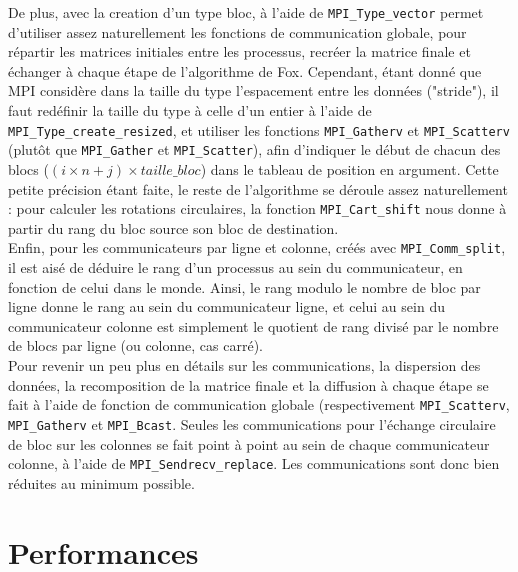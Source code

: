 \documentclass[a4paper,11pt]{article}
\begin{document}
De plus, avec la creation d'un type bloc, à l'aide de \texttt{MPI\_Type\_vector} permet d'utiliser assez naturellement les fonctions de communication globale, pour répartir les matrices initiales entre les processus, recréer la matrice finale et échanger à chaque étape de l'algorithme de Fox.
Cependant, étant donné que MPI considère dans la taille du type l'espacement entre les données ("stride"), il faut redéfinir la taille du type à celle d'un entier à l'aide de \texttt{MPI\_Type\_create\_resized}, et utiliser  les fonctions \texttt{MPI\_Gatherv} et \texttt{MPI\_Scatterv} (plutôt que \texttt{MPI\_Gather} et \texttt{MPI\_Scatter}), afin d'indiquer le début de chacun des blocs ($(i \times n + j) \times \mathit{taille\_bloc}$) dans le tableau de position en argument.
Cette petite précision étant faite, le reste de l'algorithme se déroule assez naturellement : pour calculer les rotations circulaires, la fonction \texttt{MPI\_Cart\_shift} nous donne à partir du rang du bloc source son bloc de destination.\\

Enfin, pour les communicateurs par ligne et colonne, créés avec \texttt{MPI\_Comm\_split}, il est aisé de déduire le rang d'un processus au sein du communicateur, en fonction de celui dans le monde.
Ainsi, le rang modulo le nombre de bloc par ligne donne le rang au sein du communicateur ligne, et celui au sein du communicateur colonne est simplement le quotient de rang divisé par le nombre de blocs par ligne (ou colonne, cas carré).\\

Pour revenir un peu plus en détails sur les communications, la dispersion des données, la recomposition de la matrice finale et la diffusion à chaque étape se fait à l'aide de fonction de communication globale (respectivement \texttt{MPI\_Scatterv}, \texttt{MPI\_Gatherv} et \texttt{MPI\_Bcast}.
Seules les communications pour l'échange circulaire de bloc sur les colonnes se fait point à point au sein de chaque communicateur colonne, à l'aide de \texttt{MPI\_Sendrecv\_replace}.
Les communications sont donc bien réduites au minimum possible.
 
\section{Performances}
\end{document}
